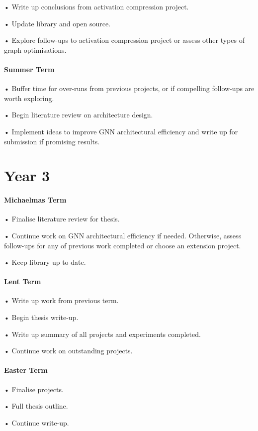 \documentclass[withindex,glossary]{cam-thesis}
\begin{document}
• Write up conclusions from activation compression project.

• Update library and open source.

• Explore follow-ups to activation compression project or assess other types of graph optimisations.

\paragraph{Summer Term}

• Buffer time for over-runs from previous projects, or if compelling follow-ups are worth exploring.

• Begin literature review on architecture design.

• Implement ideas to improve GNN architectural efficiency and write up for submission if promising results.

\section{Year 3}

\paragraph{Michaelmas Term}
• Finalise literature review for thesis.

• Continue work on GNN architectural efficiency if needed. Otherwise, assess follow-ups for any of previous work completed or choose an extension project.

• Keep library up to date.

\paragraph{Lent Term}

• Write up work from previous term.

• Begin thesis write-up.

• Write up summary of all projects and experiments completed.

• Continue work on outstanding projects.

\paragraph{Easter Term}
• Finalise projects. 

• Full thesis outline. 

• Continue write-up.
\end{document}
